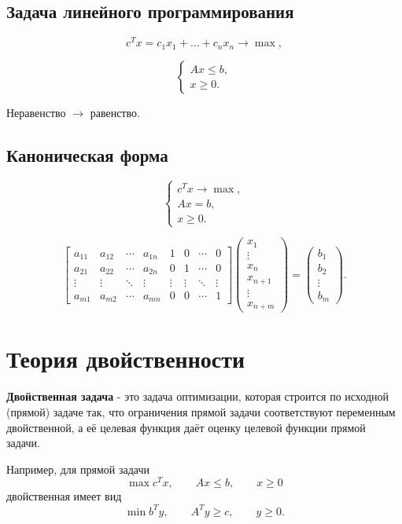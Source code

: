 \documentclass[12pt,a4paper]{article}
\begin{document}
\subsection{Задача линейного программирования}

\[
c^Tx=c_1x_1+\ldots+c_nx_n\to\max,
\]

\[
\begin{cases}
Ax\leq b,\\
x\geq 0.
\end{cases}
\]

Неравенство $\longrightarrow$ равенство.

\subsection{Каноническая форма}

\[
\begin{cases}
c^Tx\to\max,\\
Ax=b,\\
x\geq 0.
\end{cases}
\]

\[
\left[
\begin{array}{cccc|cccc}
a_{11}&a_{12}&\cdots&a_{1n}&1&0&\cdots&0\\
a_{21}&a_{22}&\cdots&a_{2n}&0&1&\cdots&0\\
\vdots&\vdots&\ddots&\vdots&\vdots&\vdots&\ddots&\vdots\\
a_{m1}&a_{m2}&\cdots&a_{mn}&0&0&\cdots&1
\end{array}
\right]
\begin{pmatrix}
x_1\\
\vdots\\
x_n\\
x_{n+1}\\
\vdots\\
x_{n+m}
\end{pmatrix}
=
\begin{pmatrix}
b_1\\
b_2\\
\vdots\\
b_m
\end{pmatrix}.
\]

\newpage

\section{Теория двойственности}

\begin{definition}
\textbf{Двойственная задача} - это задача оптимизации, которая строится по исходной (прямой) задаче так, что ограничения прямой задачи соответствуют переменным двойственной, а её целевая функция даёт оценку целевой функции прямой задачи.

Например, для прямой задачи
\[
\max c^T x,\qquad Ax\le b,\qquad x\ge0
\]
двойственная имеет вид
\[
\min b^T y,\qquad A^T y\ge c,\qquad y\ge0.
\]
\end{definition}
\end{document}
